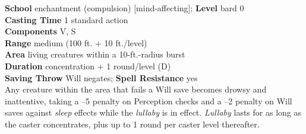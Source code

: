 \textbf{School} enchantment (compulsion) [mind-affecting]; \textbf{Level} bard 0\\
\textbf{Casting Time} 1 standard action\\
\textbf{Components} V, S\\
\textbf{Range }medium (100 ft. + 10 ft./level)\\
\textbf{Area} living creatures within a 10-ft.-radius burst\\
\textbf{Duration} concentration + 1 round/level (D)\\
\textbf{Saving Throw }Will negates; \textbf{Spell Resistance} yes\\
Any creature within the area that fails a Will save becomes drowsy and inattentive, taking a --5 penalty on Perception checks and a --2 penalty on Will saves against \textit{sleep }effects while the \textit{lullaby }is in effect. \textit{Lullaby }lasts for as long as the caster concentrates, plus up to 1 round per caster level thereafter.\\
